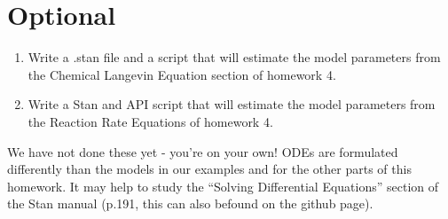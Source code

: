 \documentclass{article}\usepackage[]{graphicx}\usepackage[]{color}
\begin{document}
\section{Optional}

\begin{enumerate}
    \item Write a .stan file and a script that will estimate the model parameters from the Chemical Langevin Equation section of homework 4.
    \item Write a Stan and API script that will estimate the model parameters
      from the Reaction Rate Equations of homework 4.
\end{enumerate}

We have not done these yet - you're on your own! ODEs are formulated differently
than the models in our examples and for the other parts of this homework. It may
help to study the ``Solving Differential Equations'' section of the Stan manual (p.191, this can also befound on the github page).
\end{document}
